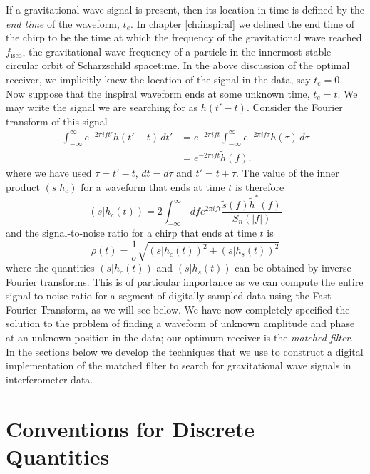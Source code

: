 If a gravitational wave signal is present, then its location in time is
defined by the \emph{end time} of the waveform, $t_e$. In chapter
\ref{ch:inspiral} we defined the end time of the chirp to be the time at which
the frequency of the gravitational wave reached $f_\mathrm{isco}$, the
gravitational wave frequency of a particle in the innermost stable circular
orbit of Scharzschild spacetime.  In the above discussion of the optimal
receiver, we implicitly knew the location of the signal in the data, say 
$t_e = 0$. Now suppose that the inspiral waveform ends at some unknown time,
$t_e = t$. We may write the signal we are searching for as $h(t'-t)$. Consider
the Fourier transform of this signal
\begin{equation}
\begin{split}
\int_{-\infty}^\infty e^{-2\pi i f t'} h(t'-t) \, dt' &= 
e^{-2\pi ift} \int_{-\infty}^\infty e^{-2\pi i f \tau} h(\tau) \, d\tau \\
&= e^{-2\pi ift} \tilde{h}(f).
\end{split}
\end{equation}
where we have used $\tau = t' - t$, $dt = d\tau$ and $t' = t + \tau$.
The value of the inner product $(s|h_c)$ for a waveform that ends at time $t$ is
therefore
\begin{equation}
(s|h_c(t)) = 2 \int_{-\infty}^\infty\,df e^{2\pi ift}
\frac{\tilde{s}(f)\tilde{h}^\ast(f)}{S_n(|f|)}
\label{eq:ipift}
\end{equation}
and the signal-to-noise ratio for a chirp that ends at time $t$ is
\begin{equation}
\rho(t) = \frac{1}{\sigma} \sqrt{ (s|h_c(t))^2 + (s|h_s(t))^2}
\end{equation}
where the quantities $(s|h_c(t))$ and $(s|h_s(t))$ can be obtained by inverse
Fourier transforms. This is of particular importance as we can compute the
entire signal-to-noise ratio for a segment of digitally sampled data using the
Fast Fourier Transform, as we will see below. We have now completely specified
the solution to the problem of finding a waveform of unknown amplitude and
phase at an unknown position in the data; our optimum receiver is the
\emph{matched filter}. In the sections below we develop the techniques that we
use to construct a digital implementation of the matched filter to search for
gravitational wave signals in interferometer data.

\section{Conventions for Discrete Quantities}
\label{s:conventions}


